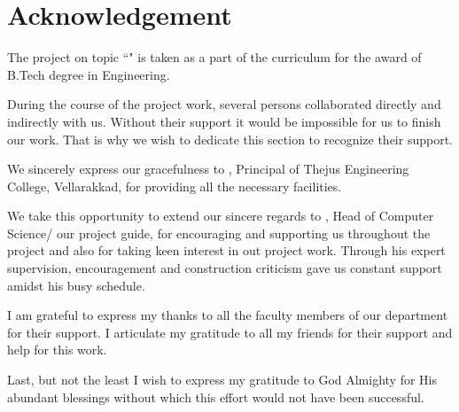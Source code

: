 \chapter*{\centering Acknowledgement}
%
\par
\hspace{0.9cm} The project on topic {``\vtitle"} is taken as a part of the curriculum for the award of B.Tech degree in \vdept Engineering.
\vspace {.2cm}
\par
\hspace{0.35cm}During the course of the project work, several persons collaborated directly and indirectly with us. Without their support it would be impossible for us to finish our work. That is why we wish to dedicate this section to recognize their support.

\vspace {.2cm}
\par
\hspace{.35cm}We sincerely express our gracefulness to \vprincipal, Principal of Thejus Engineering College, Vellarakkad, for providing all the necessary facilities. 

\vspace{.2cm}
\par 
\hspace{.35cm}We take this opportunity to extend our sincere regards to \vhod, Head of Computer Science/ our project guide, for encouraging and supporting us throughout the project and also for taking keen interest in out project work. Through his expert supervision, encouragement and construction criticism gave us constant support amidst his busy schedule.

\vspace{0.2cm}
\par
\hspace{0.35cm}I am grateful to express my thanks to all the faculty members of our  department for their support. I articulate my gratitude to all my friends  for their support and help for this work.

\vspace{0.2cm}
\par
\hspace{0.35cm}Last, but not the least I wish to express my gratitude to God Almighty for His abundant blessings without which this effort would not have been successful.\\[.3 cm]


\vspace{2.cm}
\vmonth\ 

